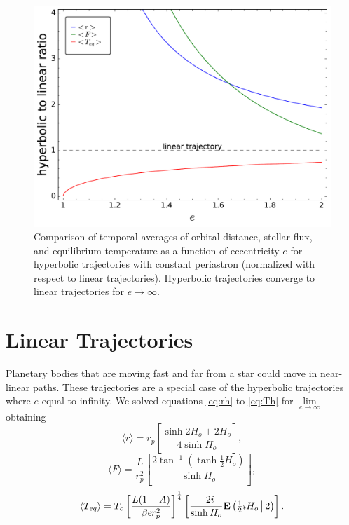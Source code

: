\documentclass[a4paper,fleqn,usenatbib]{mnras}
\begin{document}

\begin{figure}
\includegraphics[width=\columnwidth]{f3.pdf}
\caption{Comparison of temporal averages of orbital distance, stellar flux, and equilibrium temperature as a function of eccentricity $e$ for hyperbolic trajectories with constant periastron (normalized with respect to linear trajectories). Hyperbolic trajectories converge to linear trajectories for $e \to \infty$.}
\label{fig3}
\end{figure}


\section{Linear Trajectories}
\label{sec:linear}


Planetary bodies that are moving fast and far from a star  could move in near-linear paths. These trajectories are a special case of the hyperbolic trajectories where $e$ equal to infinity. We solved equations \ref{eq:rh} to \ref{eq:Th} for $\lim\limits_{e \to \infty}$ obtaining
\begin{equation} \label{eq:rl}
\langle r \rangle = r_p \left[\frac{\sinh 2H_o  + 2H_o}{4 \sinh H_o } \right],
\end{equation}
\begin{equation} \label{eq:Fl}
\langle F \rangle = \frac{L}{r_p^2} \left[ \frac{2 \tan^{-1} \left( \tanh \frac{1}{2} H_o \right)}{\sinh H_o } \right],
\end{equation}
\begin{equation} \label{eq:Tl}
\langle T_{eq} \rangle = T_o \left[\frac{L {\left(1 - A\right)}}{\beta \epsilon r_p^{2}}\right]^{\frac{1}{4}} \left[ \frac{-2 i}{\sinh H_o } {\rm \mathbf{E}} \left(\tfrac{1}{2}iH_o\, \big| \,2 \right) \right].
\end{equation}
\end{document}
